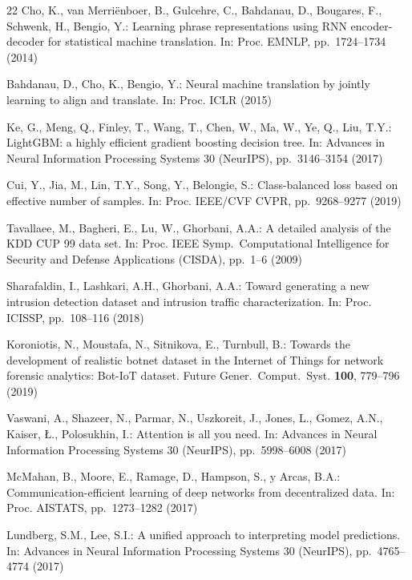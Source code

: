\documentclass{llncs}
\begin{document}
\begin{thebibliography}{22}
Cho, K., van Merri\"enboer, B., Gulcehre, C., Bahdanau, D., Bougares, F., Schwenk, H., Bengio, Y.: Learning phrase representations using RNN encoder-decoder for statistical machine translation. In: Proc. EMNLP, pp.\ 1724--1734 (2014)

Bahdanau, D., Cho, K., Bengio, Y.: Neural machine translation by jointly learning to align and translate. In: Proc. ICLR (2015)

Ke, G., Meng, Q., Finley, T., Wang, T., Chen, W., Ma, W., Ye, Q., Liu, T.Y.: LightGBM: a highly efficient gradient boosting decision tree. In: Advances in Neural Information Processing Systems 30 (NeurIPS), pp.\ 3146--3154 (2017)

Cui, Y., Jia, M., Lin, T.Y., Song, Y., Belongie, S.: Class-balanced loss based on effective number of samples. In: Proc. IEEE/CVF CVPR, pp.\ 9268--9277 (2019)

Tavallaee, M., Bagheri, E., Lu, W., Ghorbani, A.A.: A detailed analysis of the KDD CUP 99 data set. In: Proc. IEEE Symp.\ Computational Intelligence for Security and Defense Applications (CISDA), pp.\ 1--6 (2009)

Sharafaldin, I., Lashkari, A.H., Ghorbani, A.A.: Toward generating a new intrusion detection dataset and intrusion traffic characterization. In: Proc. ICISSP, pp.\ 108--116 (2018)

Koroniotis, N., Moustafa, N., Sitnikova, E., Turnbull, B.: Towards the development of realistic botnet dataset in the Internet of Things for network forensic analytics: Bot-IoT dataset. Future Gener.\ Comput.\ Syst. \textbf{100}, 779--796 (2019)

Vaswani, A., Shazeer, N., Parmar, N., Uszkoreit, J., Jones, L., Gomez, A.N., Kaiser, {\L}., Polosukhin, I.: Attention is all you need. In: Advances in Neural Information Processing Systems 30 (NeurIPS), pp.\ 5998--6008 (2017)

McMahan, B., Moore, E., Ramage, D., Hampson, S., y Arcas, B.A.: Communication-efficient learning of deep networks from decentralized data. In: Proc. AISTATS, pp.\ 1273--1282 (2017)

Lundberg, S.M., Lee, S.I.: A unified approach to interpreting model predictions. In: Advances in Neural Information Processing Systems 30 (NeurIPS), pp.\ 4765--4774 (2017)

\end{thebibliography}
\end{document}
